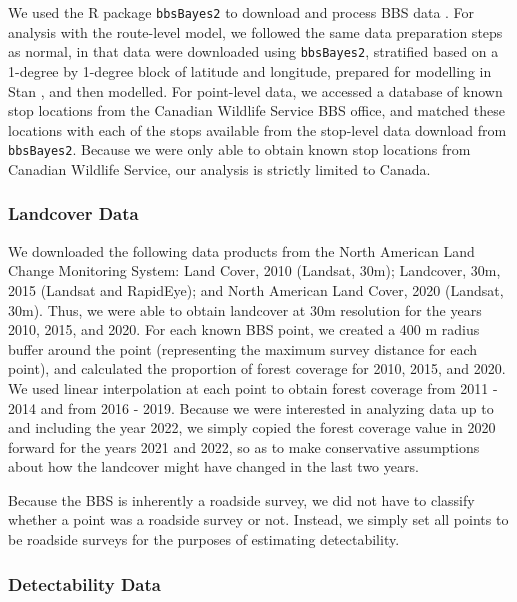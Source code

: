 \documentclass[12pt]{article}
\begin{document}
\par We used the R package \texttt{bbsBayes2} to download and process BBS data \citep{edwards_bbsbayes_2021}. 
For analysis with the route-level model, we followed the same data preparation steps as normal, in that data were downloaded using \texttt{bbsBayes2}, stratified based on a 1-degree by 1-degree block of latitude and longitude, prepared for modelling in Stan \citep{stan_development_team_stan_2024}, and then modelled.
For point-level data, we accessed a database of known stop locations from the Canadian Wildlife Service BBS office, and matched these locations with each of the stops available from the stop-level data download from \texttt{bbsBayes2}.
Because we were only able to obtain known stop locations from Canadian Wildlife Service, our analysis is strictly limited to Canada.

\subsubsection{Landcover Data}

\par We downloaded the following data products from the North American Land Change Monitoring System: Land Cover, 2010 (Landsat, 30m); Landcover, 30m, 2015 (Landsat and RapidEye); and North American Land Cover, 2020 (Landsat, 30m).
Thus, we were able to obtain landcover at 30m resolution for the years 2010, 2015, and 2020. 
For each known BBS point, we created a 400 m radius buffer around the point (representing the maximum survey distance for each point), and calculated the proportion of forest coverage for 2010, 2015, and 2020. 
We used linear interpolation at each point to obtain forest coverage from 2011 - 2014 and from 2016 - 2019. 
Because we were interested in analyzing data up to and including the year 2022, we simply copied the forest coverage value in 2020 forward for the years 2021 and 2022, so as to make conservative assumptions about how the landcover might have changed in the last two years.

\par Because the BBS is inherently a roadside survey, we did not have to classify whether a point was a roadside survey or not.
Instead, we simply set all points to be roadside surveys for the purposes of estimating detectability.

\subsubsection{Detectability Data}
\end{document}

